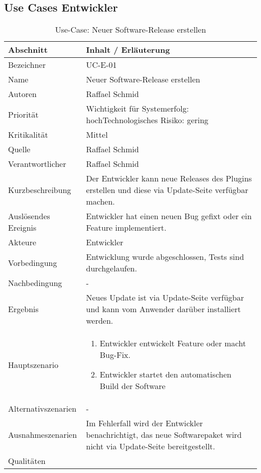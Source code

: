 \subsection{Use Cases Entwickler}
\begin{longtable}{|p{4cm}|p{10.5cm}|}
\caption{Use-Case: Neuer Software-Release erstellen}\\\hline
   \textbf{Abschnitt} & \textbf{Inhalt / Erläuterung} \\\hline
   Bezeichner & UC-E-01\\\hline
   Name & Neuer Software-Release erstellen\\\hline
   Autoren & Raffael Schmid\\\hline
   Priorität & Wichtigkeit für Systemerfolg: hoch\newline Technologisches Risiko: gering\\\hline
   Kritikalität & Mittel\\\hline
   Quelle & Raffael Schmid\\\hline
   Verantwortlicher & Raffael Schmid\\\hline
   Kurzbeschreibung & Der Entwickler kann neue Releases des Plugins erstellen und diese via Update-Seite verfügbar machen.\\\hline
   Auslösendes Ereignis & Entwickler hat einen neuen Bug gefixt oder ein Feature implementiert.\\\hline
   Akteure & Entwickler\\\hline
   Vorbedingung & Entwicklung wurde abgeschlossen, Tests sind durchgelaufen.\\\hline
   Nachbedingung & -\\\hline
   Ergebnis & Neues Update ist via Update-Seite verfügbar und kann vom Anwender darüber installiert werden.\\\hline
   Hauptszenario & 
	\begin{enumerate}
		\item Entwickler entwickelt Feature oder macht Bug-Fix.
		\item Entwickler startet den automatischen Build der Software
	\end{enumerate}
	\\\hline
   Alternativszenarien & -\\\hline
   Ausnahmeszenarien & Im Fehlerfall wird der Entwickler benachrichtigt, das neue Softwarepaket wird nicht via Update-Seite bereitgestellt.\\\hline
   Qualitäten & \\\hline
\end{longtable}



